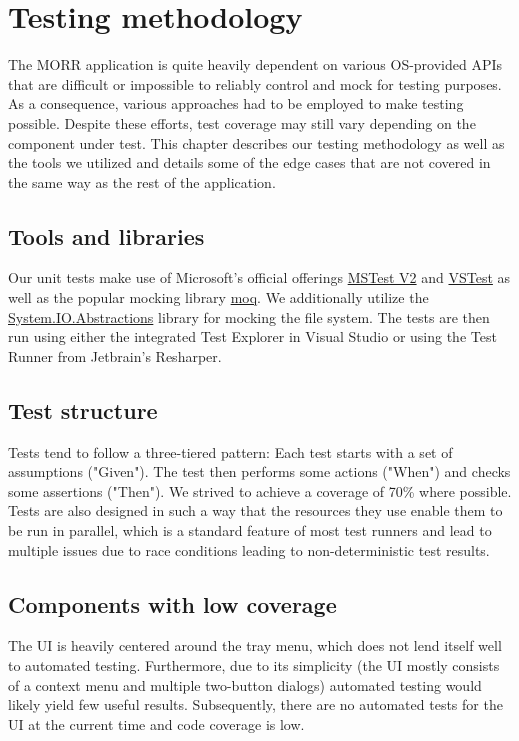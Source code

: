\chapter{Testing methodology}

The MORR application is quite heavily dependent on various OS-provided APIs that are difficult or impossible to reliably control and mock for testing purposes. As a consequence, various approaches had to be employed to make testing possible. Despite these efforts, test coverage may still vary depending on the component under test. This chapter describes our testing methodology as well as the tools we utilized and details some of the edge cases that are not covered in the same way as the rest of the application.

\section{Tools and libraries}

Our unit tests make use of Microsoft's official offerings \href{https://github.com/microsoft/testfx}{MSTest V2} and \href{https://github.com/microsoft/vstest}{VSTest} as well as the popular mocking library \href{https://github.com/moq/moq4}{moq}. We additionally utilize the \href{https://github.com/System-IO-Abstractions/System.IO.Abstractions}{System.IO.Abstractions} library for mocking the file system. The tests are then run using either the integrated Test Explorer in Visual Studio or using the Test Runner from Jetbrain's Resharper.

\section{Test structure}

Tests tend to follow a three-tiered pattern: Each test starts with a set of assumptions ("Given"). The test then performs some actions ("When") and checks some assertions ("Then").
We strived to achieve a coverage of 70\% where possible.
Tests are also designed in such a way that the resources they use enable them to be run in parallel, which is a standard feature of most test runners and lead to multiple issues due to race conditions leading to non-deterministic test results.

\section{Components with low coverage}

The UI is heavily centered around the tray menu, which does not lend itself well to automated testing. Furthermore, due to its simplicity (the UI mostly consists of a context menu and multiple two-button dialogs) automated testing would likely yield few useful results.
Subsequently, there are no automated tests for the UI at the current time and code coverage is low.

